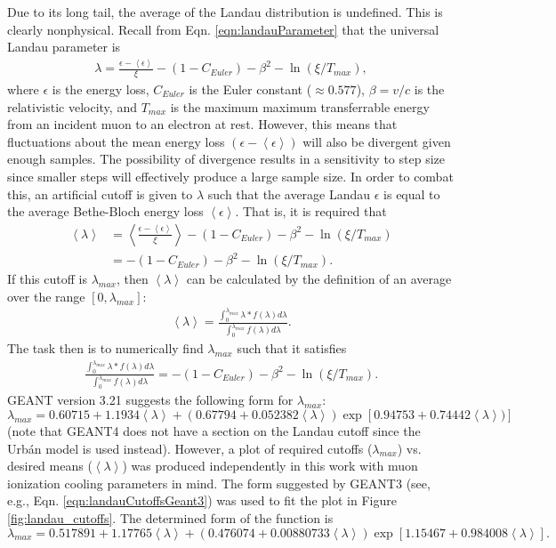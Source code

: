 Due to its long tail, the average of the Landau distribution is undefined. This is clearly nonphysical. Recall from Eqn. \ref{eqn:landauParameter} that the universal Landau parameter is
\begin{align*}
\lambda=\frac{\epsilon-\left<\epsilon\right>}{\xi}-(1-C_{Euler})-\beta ^2 -\ln (\xi/T_{max}),
\end{align*}
where $\epsilon$ is the energy loss, $C_{Euler}$ is the Euler constant ($\approx 0.577$), $\beta=v/c$ is the relativistic velocity, and $T_{max}$ is the maximum maximum transferrable energy from an incident muon to an electron at rest. However, this means that fluctuations about the mean energy loss $\left(\epsilon-\left<\epsilon\right>\right)$ will also be divergent given enough samples. The possibility of divergence results in a sensitivity to step size since smaller steps will effectively produce a large sample size. In order to combat this, an artificial cutoff is given to $\lambda$ such that the average Landau $\epsilon$ is equal to the average Bethe-Bloch energy loss $\left<\epsilon\right>$. That is, it is required that
\begin{align*}
\left<\lambda\right>&=\left<\frac{\epsilon-\left<\epsilon\right>}{\xi}\right>-(1-C_{Euler})-\beta^2-\ln(\xi/T_{max})\\
&=-(1-C_{Euler})-\beta^2-\ln(\xi/T_{max}).
\end{align*}
If this cutoff is $\lambda_{max}$, then $\left<\lambda\right>$ can be calculated by the definition of an average over the range $[0,\lambda_{max}]$:
\begin{align*}
\left<\lambda\right>=\frac{\int_0 ^{\lambda_{max}} \lambda * f(\lambda) d\lambda}{\int_0 ^{\lambda_{max}}f(\lambda) d\lambda}.
\end{align*}
The task then is to numerically find $\lambda_{max}$ such that it satisfies
\begin{align*}
\frac{\int_0 ^{\lambda_{max}} \lambda * f(\lambda) d\lambda}{\int_0 ^{\lambda_{max}}f(\lambda) d\lambda}=-(1-C_{Euler})-\beta^2-\ln(\xi/T_{max}).
\end{align*}
GEANT version 3.21 \cite{geant3.21} suggests the following form for $\lambda_{max}$:
\begin{equation} \label{eqn:landauCutoffsGeant3}
\lambda_{max}=0.60715+1.1934\left<\lambda\right>+(0.67794+0.052382\left<\lambda\right>)\exp[0.94753+0.74442\left<\lambda\right>)]
\end{equation}
(note that GEANT4 does not have a section on the Landau cutoff since the Urb\'{a}n model is used instead). However, a plot of required cutoffs ($\lambda_{max}$) vs. desired means ($\left<\lambda\right>$) was produced independently in this work with muon ionization cooling parameters in mind. The form suggested by GEANT3 (see, e.g., Eqn. \ref{eqn:landauCutoffsGeant3}) was used to fit the plot in Figure \ref{fig:landau_cutoffs}. The determined form of the function is
\begin{equation}\label{eqn:landauCutoffs}
\lambda_{max}=0.517891+1.17765\left<\lambda\right>+(0.476074+0.00880733\left<\lambda\right>)\exp[1.15467+0.984008\left<\lambda\right>].
\end{equation}

